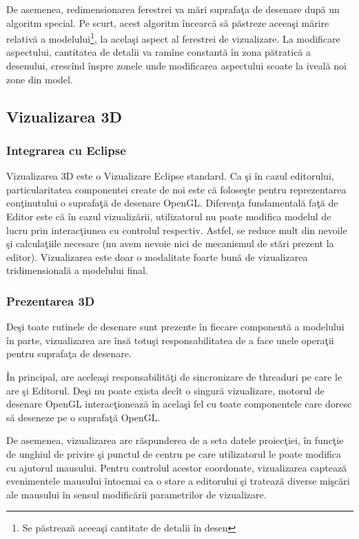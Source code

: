 De asemenea, redimensionarea ferestrei va mări suprafaţa de desenare după un
algoritm special. Pe scurt, acest algoritm încearcă să păstreze aceeaşi mărire
relativă a modelului\footnote{Se păstrează aceeaşi cantitate de detalii în
desen}, la acelaşi aspect al ferestrei de vizualizare. La modificare aspectului,
cantitatea de detalii va ramîne constantă în zona pătratică a desenului,
crescînd înspre zonele unde modificarea aspectului scoate la iveală noi zone din
model.

\subsection{Vizualizarea 3D}
\label{section:impl-view}

\subsubsection{Integrarea cu Eclipse}
Vizualizarea 3D este o Vizualizare Eclipse standard. Ca şi în cazul editorului,
particularitatea componentei create de noi este că foloseşte pentru
reprezentarea conţinutului o suprafaţă de desenare OpenGL. Diferenţa
fundamentală faţă de Editor este că în cazul vizualizării, utilizatorul nu
poate modifica modelul de lucru prin interacţiunea cu controlul respectiv.
Astfel, se reduce mult din nevoile şi calculaţiile necesare (nu avem nevoie nici
de mecanismul de stări prezent la editor). Vizualizarea este doar o modalitate
foarte bună de vizualizarea tridimensională a modelului final.

\subsubsection{Prezentarea 3D}
Deşi toate rutinele de desenare sunt prezente în fiecare componentă a modelului
în parte, vizualizarea are însă totuşi responsabilitatea de a face unele
operaţii pentru suprafaţa de desenare.

În principal, are aceleaşi responsabilităţi de sincronizare de threaduri pe care
le are şi Editorul. Deşi nu poate exista decît o singură vizualizare, motorul de
desenare OpenGL interacţionează în acelaşi fel cu toate componentele care doresc
să deseneze pe o suprafaţă OpenGL.

De asemenea, vizualizarea are răspunderea de a seta datele proiecţiei, în
funcţie de unghiul de privire şi punctul de centru pe care utilizatorul le poate
modifica cu ajutorul mausului. Pentru controlul acestor coordonate, vizualizarea
captează evenimentele mausului întocmai ca o stare a editorului şi tratează
diverse mişcări ale mausului în sensul modificării parametrilor de vizualizare.

